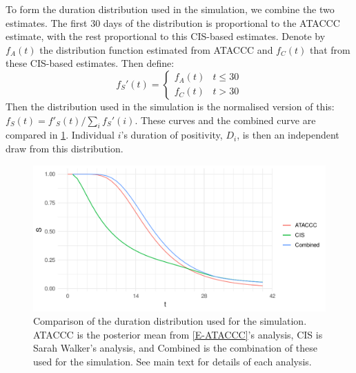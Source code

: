 \documentclass[thesis.tex]{subfiles}
\begin{document}

To form the duration distribution used in the simulation, we combine the two estimates.
The first 30 days of the distribution is proportional to the ATACCC estimate, with the rest proportional to this CIS-based estimates.
Denote by $f_A(t)$ the distribution function estimated from ATACCC and $f_C(t)$ that from these CIS-based estimates.
Then define:
$$
f_S'(t) = \begin{cases}
	f_A(t) &t \leq 30 \\
	f_C(t) &t > 30
\end{cases}
$$
Then the distribution used in the simulation is the normalised version of this: $f_S(t) = f'_S(t)/\sum_i f_S'(i)$.
These curves and the combined curve are compared in \cref{perf-test:fig:duration-dist}.
Individual $i$'s duration of positivity, $D_i$, is then an independent draw from this distribution.
\begin{figure}
  \centering \includegraphics{cis-perfect-testing/input-duration-dists}
  \caption[Comparison of duration distributions]{Comparison of the duration distribution used for the simulation. ATACCC is the posterior mean from \cref{E-ATACCC}'s analysis, CIS is Sarah Walker's analysis, and Combined is the combination of these used for the simulation. See main text for details of each analysis. \label{perf-test:fig:duration-dist}}
\end{figure}
\end{document}
